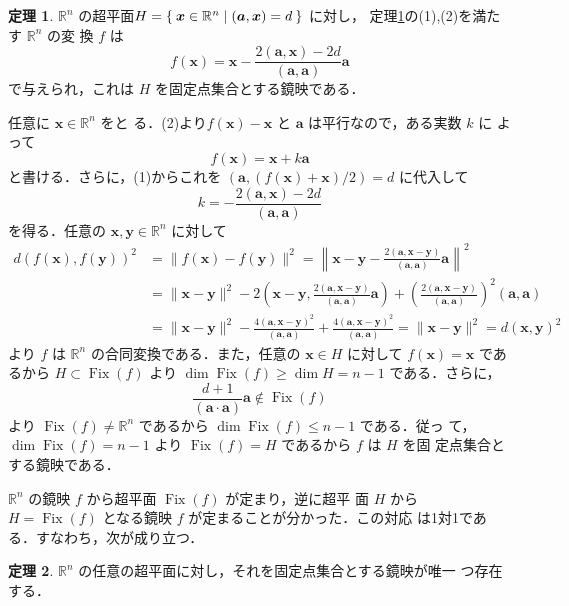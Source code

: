 \documentclass[11pt, uplatex, dvipdfmx, titlepage]{jsarticle}
\makeatletter
\DeclareMathOperator{\Fix}{Fix}
\renewenvironment{proof}[1][\proofname]{\par
  \pushQED{\qed}%
  \normalfont \topsep6\p@\@plus6\p@\relax
  \trivlist
  \item[\hskip\labelsep
         \bfseries
    {#1}]\ignorespaces
}{%
  \popQED\endtrivlist\@endpefalse
}
\theoremstyle{definition}
\newtheorem{theorem}{定理}[section]
\renewcommand{\proofname}{\textbf{証明}}
\makeatother
\begin{document}
\begin{theorem}\label{thm:ref-equation}
  $\mathbb{R}^n$
  の超平面$H=\Set{\bm{x} \in \mathbb{R}^n | (\bm{a}, \bm{x})=d}$ に対し，
  定理\ref{thm:ref-equation}の(1),(2)を満たす $\mathbb{R}^n$ の変
  換 $f$ は
  \[
    f(\bm{x}) = \bm{x} - \frac{2(\bm{a}, \bm{x}) - 2d}{(\bm{a}, \bm{a})} \bm{a}
  \]
  で与えられ，これは $H$ を固定点集合とする鏡映である．
\end{theorem}
\begin{proof}
  任意に $\bm{x} \in \mathbb{R}^n$ をと
  る．(2)より$f(\bm{x})-\bm{x}$ と $\bm{a}$ は平行なので，ある実数 $k$ に
  よって
  \[
    f(\bm{x}) = \bm{x} + k \bm{a}
  \]
  と書ける．さらに，(1)からこれを $\left( \bm{a}, \left(f(\bm{x})+\bm{x}\right)/2\right)=d$ に代入して
  \[
    k = -\frac{2(\bm{a},\bm{x})-2d}{(\bm{a},\bm{a})}
  \]
  を得る．任意の $\bm{x},
  \bm{y} \in \mathbb{R}^n$ に対して
  \[
    \begin{aligned}
      d(f(\bm{x}), f(\bm{y}))^2 &= \|f(\bm{x}) - f(\bm{y})\|^2
      = \left\|\bm{x} - \bm{y} - \frac{2\left(\bm{a}, \bm{x}-\bm{y}\right)}{(\bm{a}, \bm{a})} \bm{a}\right\|^2\\
       &= \|\bm{x}-\bm{y}\|^2
       - 2 \left( \bm{x}-\bm{y}, \frac{2(\bm{a}, \bm{x}-\bm{y})}{(\bm{a},\bm{a})}\bm{a}\right)
       + \left( \frac{2(\bm{a}, \bm{x}-\bm{y})}{(\bm{a},\bm{a})}\right)^2(\bm{a}, \bm{a})\\
       &= \|\bm{x}-\bm{y}\|^2 - \frac{4(\bm{a},\bm{x}-\bm{y})^2}{(\bm{a},\bm{a})}
       + \frac{4(\bm{a}, \bm{x}-\bm{y})^2}{(\bm{a}, \bm{a})}
        = \|\bm{x}-\bm{y}\|^2 = d(\bm{x}, \bm{y})^2
      \end{aligned}
  \]
  より $f$ は $\mathbb{R}^n$ の合同変換である．また，任意の $\bm{x}
  \in H$ に対して $f(\bm{x}) = \bm{x}$ であるから $H \subset \Fix(f)$
  より $\dim \Fix(f) \geq \dim H = n-1$
  である．さらに，
  \[
    \frac{d+1}{(\bm{a}\cdot \bm{a})}\bm{a} \notin \Fix(f)
  \]
  より $\Fix(f) \neq
  \mathbb{R}^n$ であるから $\dim \Fix(f) \leq n-1$ である．従っ
  て，$\dim\Fix(f) = n-1$ より $\Fix(f) = H$ であるから $f$ は $H$ を固
  定点集合とする鏡映である．
\end{proof}

$\mathbb{R}^n$ の鏡映 $f$ から超平面 $\Fix(f)$ が定まり，逆に超平
面 $H$ から $H=\Fix(f)$ となる鏡映 $f$ が定まることが分かった．この対応
は1対1である．すなわち，次が成り立つ．

\begin{theorem}\label{thm:ref-hyperplane}
  $\mathbb{R}^n$ の任意の超平面に対し，それを固定点集合とする鏡映が唯一
  つ存在する．
\end{theorem}
\end{document}
